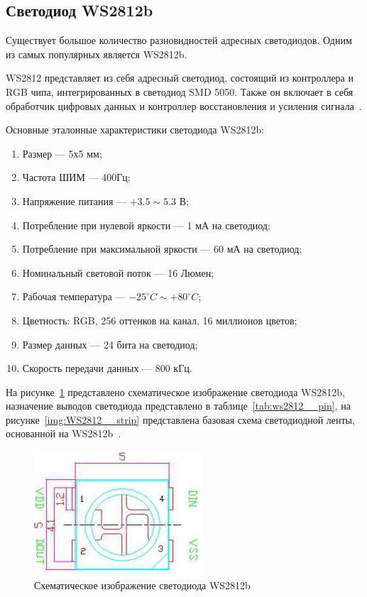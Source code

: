 \subsection{Светодиод WS2812b}

Существует большое количество разновидностей адресных светодиодов. Одним из самых популярных является WS2812b.

WS2812 представляет из себя адресный светодиод, состоящий из контроллера и RGB чипа, интегрированных в светодиод SMD 5050. Также он включает в себя обработчик цифровых данных и контроллер восстановления и усиления сигнала~\cite{Worldseim}.

Основные эталонные характеристики светодиода WS2812b:

\begin{enumerate}
  \item Размер --- 5х5 мм;
  \item Частота ШИМ --- 400Гц;
  \item Напряжение питания --- $+3.5 \sim 5.3$ В;
  \item Потребление при нулевой яркости --- 1 мА на светодиод;
  \item Потребление при максимальной яркости --- 60 мА на светодиод;
  \item Номинальный световой поток --- 16 Люмен;
  \item Рабочая температура --- $-25^\circ C \sim +80^\circ C$;
  \item Цветность: RGB, 256 оттенков на канал, 16 миллионов цветов;
  \item Размер данных --- 24 бита на светодиод;
  \item Скорость передачи данных --- 800 кГц.
\end{enumerate}

На рисунке~\ref{img:WS2812__schema} представлено схематическое изображение светодиода WS2812b, назначение выводов светодиода представлено в таблице~\ref{tab:ws2812__pin}, на рисунке~\ref{img:WS2812__strip} представлена базовая схема светодиодной ленты, основанной на WS2812b~\cite{Worldseim}.

\begin{figure}[H]
  \centering
  \includegraphics[height=0.2\textheight]{assets/images/theoretical/Схема светодиода.png}
  \caption{Схематическое изображение светодиода WS2812b}
  \label{img:WS2812__schema}
\end{figure}

